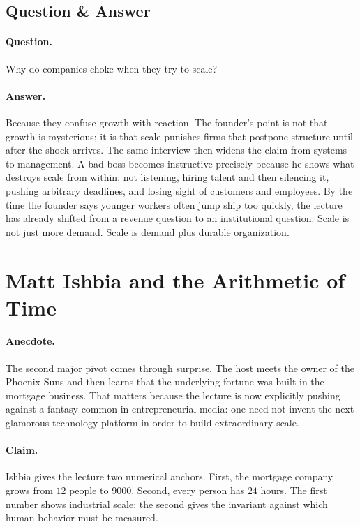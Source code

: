 \subsection{Question \& Answer}

\paragraph{Question.} Why do companies choke when they try to scale?

\paragraph{Answer.} Because they confuse growth with reaction. The founder's point is not that growth is mysterious; it is that scale punishes firms that postpone structure until after the shock arrives. The same interview then widens the claim from systems to management. A bad boss becomes instructive precisely because he shows what destroys scale from within: not listening, hiring talent and then silencing it, pushing arbitrary deadlines, and losing sight of customers and employees. By the time the founder says younger workers often jump ship too quickly, the lecture has already shifted from a revenue question to an institutional question. Scale is not just more demand. Scale is demand plus durable organization.

\section{Matt Ishbia and the Arithmetic of Time}

\paragraph{Anecdote.} The second major pivot comes through surprise. The host meets the owner of the Phoenix Suns and then learns that the underlying fortune was built in the mortgage business. That matters because the lecture is now explicitly pushing against a fantasy common in entrepreneurial media: one need not invent the next glamorous technology platform in order to build extraordinary scale.

\paragraph{Claim.} Ishbia gives the lecture two numerical anchors. First, the mortgage company grows from \(12\) people to \(9000\). Second, every person has \(24\) hours. The first number shows industrial scale; the second gives the invariant against which human behavior must be measured.


